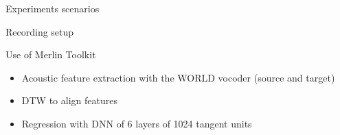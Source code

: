 \documentclass[final]{beamer}
\newlength{\onecolwid}
\newlength{\twocolwid}
\begin{document}
\begin{frame}[t]
\begin{columns}[t]
\begin{column}{\onecolwid}
\begin{block}{Experiments scenarios}

\end{block}












\begin{block}{Recording setup}


Use of Merlin Toolkit
\begin{itemize}
    \item Acoustic feature extraction with the WORLD vocoder (source and target)
    \item DTW to align features
    \item Regression with DNN of 6 layers of 1024 tangent units
\end{itemize}


\end{block}
\end{column}
\end{columns}
\end{frame}
\end{document}
